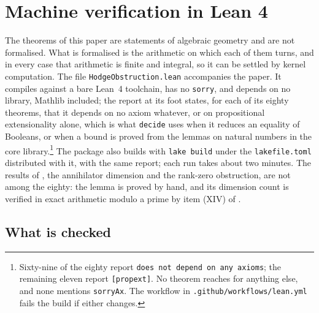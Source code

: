 \section{Machine verification in Lean 4}\label{sec:lean}

The theorems of this paper are statements of algebraic geometry and are not
formalised. What is formalised is the arithmetic on which each of them turns,
and in every case that arithmetic is finite and integral, so it can be settled
by kernel computation. The file \texttt{HodgeObstruction.lean} accompanies the
paper. It compiles against a bare Lean~4 toolchain, has no \texttt{sorry}, and
depends on no library, Mathlib included; the report at its foot states, for
each of its eighty theorems, that it depends on no axiom whatever, or on
propositional extensionality alone, which is what \texttt{decide} uses when it
reduces an equality of Booleans, or when a bound is proved from the lemmas
on natural numbers in the core library.\footnote{Sixty-nine of the eighty
report \texttt{does not depend on any axioms}; the remaining eleven report
\texttt{[propext]}. No theorem reaches for anything else, and none mentions
\texttt{sorryAx}. The workflow in \texttt{.github/workflows/lean.yml} fails the
build if either changes.} The package also builds with \texttt{lake build}
under the \texttt{lakefile.toml} distributed with it, with the same report;
each run takes about two minutes. The results of , the annihilator
dimension and the rank-zero obstruction, are not among the eighty: the
lemma is proved by hand, and its dimension count is verified in exact
arithmetic modulo a prime by item (XIV) of .

\subsection{What is checked}

